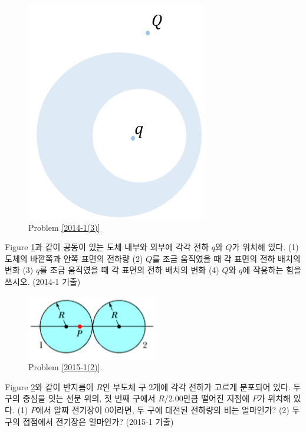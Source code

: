 \begin{problem}\label{2014-1(3)}
\begin{figure}[h]
\centering\includegraphics[scale=0.5]{Pictures/2014-1(3).PNG}
\caption{Problem \ref{2014-1(3)}}
\label{fig:2014-1(3)}
\end{figure}
Figure \ref{fig:2014-1(3)}과 같이 공동이 있는 도체 내부와 외부에 각각 전하 $q$와 $Q$가 위치해 있다. (1) 도체의 바깥쪽과 안쪽 표면의 전하량 (2) $Q$를 조금 움직였을 때 각 표면의 전하 배치의 변화 (3) $q$를 조금 움직였을 때 각 표면의 전하 배치의 변화 (4) $Q$와 $q$에 작용하는 힘을 쓰시오. (2014-1 기출)
\end{problem}

\begin{problem}\label{2015-1(2)}
\begin{figure}[h]
\centering\includegraphics[scale=1.0]{Pictures/2015-1(2).PNG}
\caption{Problem \ref{2015-1(2)}}
\label{fig:2015-1(2)}
\end{figure}
Figure \ref{fig:2015-1(2)}와 같이 반지름이 $R$인 부도체 구 2개에 각각 전하가 고르게 분포되어 있다. 두 구의 중심을 잇는 선분 위의, 첫 번째 구에서 $R/2.00$만큼 떨어진 지점에 $P$가 위치해 있다. (1) $P$에서 알짜 전기장이 0이라면, 두 구에 대전된 전하량의 비는 얼마인가? (2) 두 구의 접점에서 전기장은 얼마인가? (2015-1 기출)

\end{problem}

